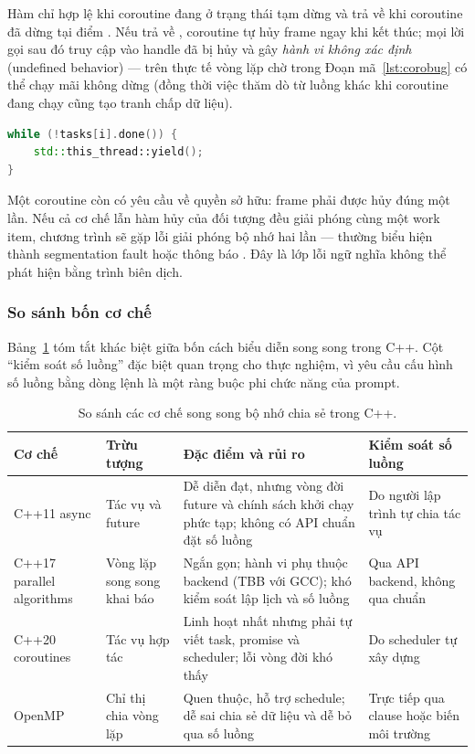 Hàm  chỉ hợp lệ khi coroutine đang ở trạng
thái tạm dừng và trả về  khi coroutine đã dừng tại điểm
. Nếu  trả về
, coroutine tự hủy frame ngay khi kết thúc; mọi lời gọi
 sau đó truy cập vào handle đã bị hủy và gây \emph{hành vi không xác
định} (undefined behavior) — trên thực tế vòng lặp chờ trong
Đoạn mã~\ref{lst:corobug} có thể chạy mãi không dừng (đồng thời việc thăm dò
 từ luồng khác khi coroutine đang chạy cũng tạo tranh chấp dữ liệu).

\begin{lstlisting}[language=C++,caption={Vòng lặp chờ \code{done()} không bao giờ kết thúc khi \code{final\_suspend} là \code{suspend\_never}.},label={lst:corobug}]
while (!tasks[i].done()) {
    std::this_thread::yield();
}
\end{lstlisting}

Một coroutine còn có yêu cầu về quyền sở hữu: frame phải được hủy đúng một lần.
Nếu cả cơ chế  lẫn hàm hủy của đối tượng  đều
giải phóng cùng một work item, chương trình sẽ gặp lỗi giải phóng bộ nhớ hai lần
— thường biểu hiện thành segmentation fault hoặc thông báo
. Đây là lớp lỗi ngữ nghĩa không thể phát hiện bằng
trình biên dịch.

\subsubsection{So sánh bốn cơ chế}

Bảng~\ref{tab:cppmodels} tóm tắt khác biệt giữa bốn cách biểu diễn song song
trong C++. Cột “kiểm soát số luồng” đặc biệt quan trọng cho thực nghiệm, vì yêu
cầu cấu hình số luồng bằng dòng lệnh là một ràng buộc phi chức năng của prompt.

\begin{table}[H]
\centering
\small
\caption{So sánh các cơ chế song song bộ nhớ chia sẻ trong C++.}
\label{tab:cppmodels}
\begin{tabularx}{\textwidth}{@{}p{2.9cm} p{3.0cm} X p{2.6cm}@{}}
\toprule
\textbf{Cơ chế} & \textbf{Trừu tượng} & \textbf{Đặc điểm và rủi ro} & \textbf{Kiểm soát số luồng} \\
\midrule
C++11 async & Tác vụ và future & Dễ diễn đạt, nhưng vòng đời future và chính sách khởi chạy phức tạp; không có API chuẩn đặt số luồng & Do người lập trình tự chia tác vụ \\
C++17 parallel algorithms & Vòng lặp song song khai báo & Ngắn gọn; hành vi phụ thuộc backend (TBB với GCC); khó kiểm soát lập lịch và số luồng & Qua API backend, không qua chuẩn \\
C++20 coroutines & Tác vụ hợp tác & Linh hoạt nhất nhưng phải tự viết task, promise và scheduler; lỗi vòng đời khó thấy & Do scheduler tự xây dựng \\
OpenMP & Chỉ thị chia vòng lặp & Quen thuộc, hỗ trợ schedule; dễ sai chia sẻ dữ liệu và dễ bỏ qua số luồng & Trực tiếp qua clause hoặc biến môi trường \\
\bottomrule
\end{tabularx}
\end{table}

